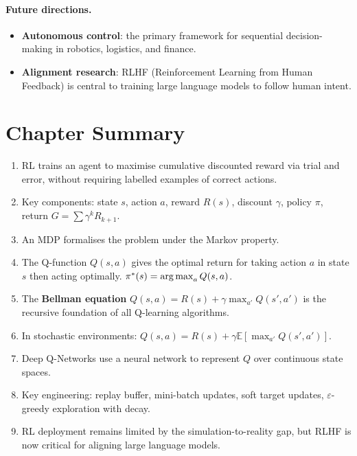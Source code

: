 \paragraph{Future directions.}
\begin{itemize}
\item \textbf{Autonomous control}: the primary framework for sequential
  decision-making in robotics, logistics, and finance.
\item \textbf{Alignment research}: RLHF (Reinforcement Learning from Human
  Feedback) is central to training large language models to follow human intent.
\end{itemize}

\section*{Chapter Summary}

\begin{enumerate}
\item RL trains an agent to maximise cumulative discounted reward via trial and
  error, without requiring labelled examples of correct actions.
\item Key components: state $s$, action $a$, reward $R(s)$, discount $\gamma$,
  policy $\pi$, return $G=\sum\gamma^k R_{k+1}$.
\item An MDP formalises the problem under the Markov property.
\item The Q-function $Q(s,a)$ gives the optimal return for taking action $a$
  in state $s$ then acting optimally. $\pi^*(s)=\operatorname*{arg\,max}_a Q(s,a)$.
\item The \textbf{Bellman equation} $Q(s,a)=R(s)+\gamma\max_{a'}Q(s',a')$
  is the recursive foundation of all Q-learning algorithms.
\item In stochastic environments: $Q(s,a)=R(s)+\gamma\mathbb{E}[\max_{a'}Q(s',a')]$.
\item Deep Q-Networks use a neural network to represent $Q$ over continuous
  state spaces.
\item Key engineering: replay buffer, mini-batch updates, soft target updates,
  $\varepsilon$-greedy exploration with decay.
\item RL deployment remains limited by the simulation-to-reality gap, but
  RLHF is now critical for aligning large language models.
\end{enumerate}
